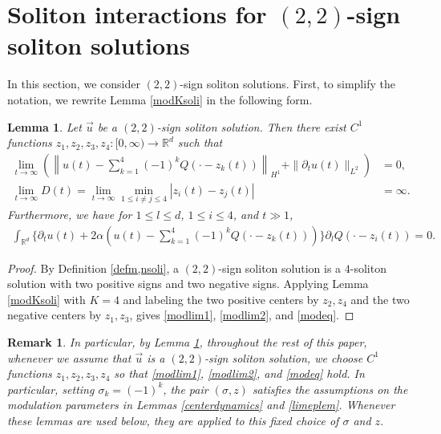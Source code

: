 \documentclass[10pt,a4paper]{amsart}
\newtheorem{lemma}[theorem]{Lemma}
\newtheorem{remark}{Remark}[section]
\numberwithin{equation}{section}
\begin{document}
\section{Soliton interactions for $(2,2)$-sign soliton solutions}
In this section, we consider $(2,2)$-sign soliton solutions. First, to simplify the notation, we rewrite Lemma \ref{modKsoli} in the following form.
\begin{lemma}\label{Ksolikakikae}
Let $\vec{u}$ be a $(2,2)$-sign soliton solution. Then there exist $C^1$ functions $z_1,z_2,z_3,z_4:[0,\infty)\to \mathbb{R}^d$ such that 
\begin{align}
\lim_{t\to\infty}(\left\| u(t)-\sum_{k=1}^4 (-1)^kQ(\cdot-z_k(t))\right\|_{H^1}+\|{\partial}_tu(t)\|_{L^2})&=0,\label{modlim1}
\\
\lim_{t\to\infty}D(t)=\lim_{t\to\infty} \min_{1\leq i\neq j\leq 4}|z_i(t)-z_j(t)|&=\infty. \label{modlim2}
\end{align}
Furthermore, we have for $1\leq l\leq d$, $1\leq i\leq 4$, and $t\gg 1$,
\begin{align}\label{modeq}
\int_{\mathbb{R}^d} \{ {\partial}_tu(t)+2\alpha(u(t)-\sum_{k=1}^4 (-1)^kQ(\cdot-z_k(t)))\} {\partial}_lQ(\cdot-z_i(t))=0.
\end{align}
\end{lemma}
\begin{proof}
By Definition \ref{defm,nsoli}, a $(2,2)$-sign soliton solution is a
$4$-soliton solution with two positive signs and two negative signs.
Applying Lemma \ref{modKsoli} with $K=4$ and labeling the two positive
centers by $z_2, z_4$ and the two negative centers by $z_1, z_3$, gives
\eqref{modlim1}, \eqref{modlim2}, and \eqref{modeq}.
\end{proof}


\begin{remark}
In particular, by Lemma \ref{Ksolikakikae}, throughout the rest of this paper, whenever we assume that $\vec{u}$ is a
$(2,2)$-sign soliton solution, we choose $C^1$ functions $z_1,z_2,z_3,z_4$ so that \eqref{modlim1}, \eqref{modlim2},
and \eqref{modeq} hold. In particular, setting $\sigma_k=(-1)^k$, the pair $(\sigma,z)$ satisfies the
assumptions on the modulation parameters in Lemmas \ref{centerdynamics} and \ref{limeplem}. Whenever these lemmas
are used below, they are applied to this fixed choice of $\sigma$ and $z$.
\end{remark}
\end{document}
